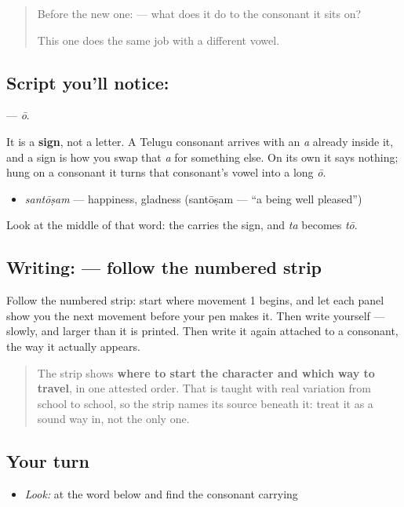 \label{lesson:TE-S153-vowel-sign-oo}



\begin{quote}
Before the new one:  — what does it do to the consonant it sits on?

This one does the same job with a different vowel.
\end{quote}

\subsection*{Script you'll notice: }
\textbf{} — \emph{ō}.

It is a \textbf{sign}, not a letter. A Telugu consonant arrives with an \emph{a} already inside it, and a sign is how you swap that \emph{a} for something else. On its own it says nothing; hung on a consonant it turns that consonant's vowel into a long \emph{ō}.

\begin{itemize}
\raggedright
  \item \textbf{} \emph{santōṣam} — happiness, gladness (santōṣam — \textquotedblleft{}a being well pleased\textquotedblright{})
\end{itemize}

Look at the middle of that word: the \textbf{} carries the sign, and \emph{ta} becomes \emph{tō}.

\subsection*{Writing:  — follow the numbered strip}

Follow the numbered strip: start where movement 1 begins, and let each panel show you the next movement before your pen makes it. Then write  yourself — slowly, and larger than it is printed. Then write it again attached to a consonant, the way it actually appears.

\begin{quote}
The strip shows \textbf{where to start the character and which way to travel}, in one attested order. That is taught with real variation from school to school, so the strip names its source beneath it: treat it as a sound way in, not the only one.
\end{quote}

\subsection*{Your turn}
\begin{itemize}
\raggedright
  \item \emph{Look:} at the word below and find the consonant carrying 
\end{itemize}

